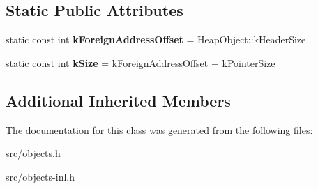 \subsection*{Static Public Attributes}
\begin{DoxyCompactItemize}
\item 
\hypertarget{classv8_1_1internal_1_1_foreign_af4241dc31655e2432335e9c5e9de11ff}{}static const int {\bfseries k\+Foreign\+Address\+Offset} = Heap\+Object\+::k\+Header\+Size\label{classv8_1_1internal_1_1_foreign_af4241dc31655e2432335e9c5e9de11ff}

\item 
\hypertarget{classv8_1_1internal_1_1_foreign_a4c89f141a3a79948c4f3b078cf6688cf}{}static const int {\bfseries k\+Size} = k\+Foreign\+Address\+Offset + k\+Pointer\+Size\label{classv8_1_1internal_1_1_foreign_a4c89f141a3a79948c4f3b078cf6688cf}

\end{DoxyCompactItemize}
\subsection*{Additional Inherited Members}


The documentation for this class was generated from the following files\+:\begin{DoxyCompactItemize}
\item 
src/objects.\+h\item 
src/objects-\/inl.\+h\end{DoxyCompactItemize}
